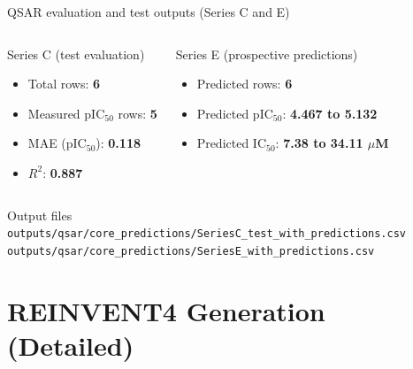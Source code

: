 \documentclass[aspectratio=169,10pt]{beamer}
\begin{document}
\begin{frame}{QSAR evaluation and test outputs (Series C and E)}
  \small
  \begin{columns}[T]
      \begin{block}{Series C (test evaluation)}
        \begin{itemize}
          \item Total rows: \textbf{6}
          \item Measured pIC\(_{50}\) rows: \textbf{5}
          \item MAE (pIC\(_{50}\)): \textbf{0.118}
          \item \(R^2\): \textbf{0.887}
        \end{itemize}
      \end{block}
      \begin{block}{Series E (prospective predictions)}
        \begin{itemize}
          \item Predicted rows: \textbf{6}
          \item Predicted pIC\(_{50}\): \textbf{4.467 to 5.132}
          \item Predicted IC\(_{50}\): \textbf{7.38 to 34.11 \(\mu\)M}
        \end{itemize}
      \end{block}
  \end{columns}

  \vspace{2pt}
  \begin{exampleblock}{Output files}
    {\scriptsize\texttt{outputs/qsar/core\_predictions/SeriesC\_test\_with\_predictions.csv}}\\
    {\scriptsize\texttt{outputs/qsar/core\_predictions/SeriesE\_with\_predictions.csv}}
  \end{exampleblock}
\end{frame}

\section{REINVENT4 Generation (Detailed)}
\end{document}
